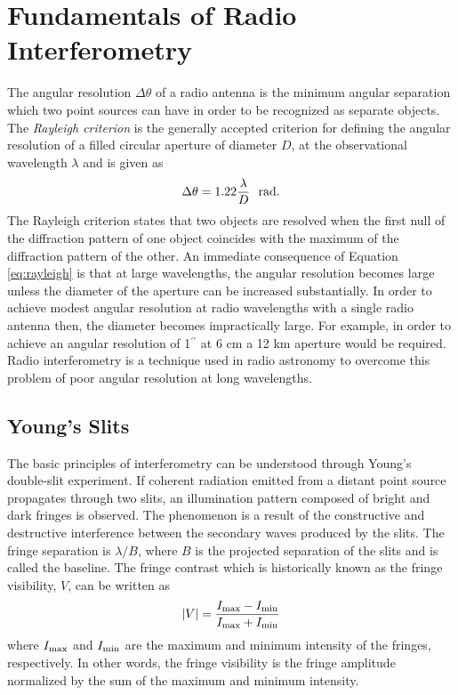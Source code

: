 \section{Fundamentals of Radio Interferometry}\label{sec:3}
The angular resolution $\Delta \theta$ of a radio antenna is the minimum angular separation which two point sources can have in order to be recognized as separate objects. The \textit{Rayleigh criterion} is the generally accepted criterion for defining the angular resolution of a filled circular aperture of diameter $D$, at the observational wavelength $\lambda$ and is given as
\begin{equation}
\Delta \theta=1.22\frac{\lambda}{D} \ \ \rm{rad}.
\label{eq:rayleigh}
\end{equation}
The Rayleigh criterion states that two objects are resolved when the first null of the diffraction pattern of one object coincides with the maximum of the diffraction pattern of the other. An immediate consequence of Equation \ref{eq:rayleigh} is that at large wavelengths, the angular resolution becomes large unless the diameter of the aperture can be increased substantially. In order to achieve modest angular resolution at radio wavelengths with a single radio antenna then, the diameter becomes impractically large. For example, in order to achieve an angular resolution of 1$^{\prime \prime}$ at 6 cm a 12 km aperture would be required. Radio interferometry is a technique used in radio astronomy to overcome this problem of poor angular resolution at long wavelengths. 

\subsection{Young's Slits}\label{subsec:4}
The basic principles of interferometry can be understood through Young's double-slit experiment. If coherent radiation emitted from a distant point source propagates through two slits, an illumination pattern composed of bright and dark fringes is observed. The phenomenon is a result of the constructive and destructive interference between the secondary waves produced by the slits. The fringe separation is $\lambda /B$, where $B$ is the projected separation of the slits and is called the baseline. The fringe contrast which is historically known as the fringe visibility, $V$, can be written as
\begin{equation}
|V| = \frac{I_{\rm{max}}-I_{\rm{min}}}{I_{\rm{max}} + I_{\rm{min}}}
\end{equation}
where $I_{\rm{max}}$ and $I_{\rm{min}}$ are the maximum and minimum intensity of the fringes, respectively. In other words, the fringe visibility is the fringe amplitude normalized by the sum of the maximum and minimum intensity. 

